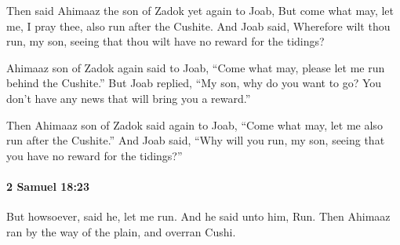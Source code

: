 			\begin{versebox}
					\item[BHS] 
					\item[ASV] Then said Ahimaaz the son of Zadok yet again to Joab, But come what may, let me, I pray thee, also run after the Cushite. And Joab said, Wherefore wilt thou run, my son, seeing that thou wilt have no reward for the tidings?
					\item[NIV] Ahimaaz son of Zadok again said to Joab, “Come what may, please let me run behind the Cushite.” But Joab replied, “My son, why do you want to go? You don’t have any news that will bring you a reward.”
					\item[NRSV] Then Ahimaaz son of Zadok said again to Joab, “Come what may, let me also run after the Cushite.” And Joab said, “Why will you run, my son, seeing that you have no reward for the tidings?”
			\end{versebox}

		\paragraph{2 Samuel 18:23} %
			\label{2SAMUEL-18-23}

			But howsoever, said he, let me run. And he said unto him, Run. Then Ahimaaz ran by the way of the plain, and overran Cushi.

